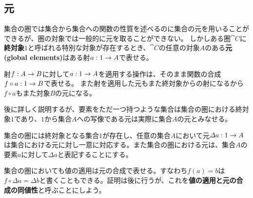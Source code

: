\subsection{元}\label{chap-3.1-element}
		集合の圏では集合から集合への関数の性質を述べるのに集合の元を用いることができるが、圏の対象では一般的に元を取ることができない。
		しかしある圏$\cat{C}$に\textbf{終対象}$1$と呼ばれる特別な対象が存在するとき、$\cat{C}$の任意の対象$A$のある\textbf{元(global elements)}はある射$a:1\rightarrow A$で表せる。
		\begin{center}
		\end{center}

		射$f:A\rightarrow B$に対して$a:1\rightarrow A$を適用する操作は、そのまま関数の合成$f\circ a:1\rightarrow B$で表せる。
		また射を適用した元もまた終対象からの射になるから$f\circ a$もまた対象$B$の元になる。

		後に詳しく説明するが、要素をただ一つ持つような集合は集合の圏における終対象$1$であり、$1$から集合$A$への写像である元は実際に集合$A$の元とみなせる。
		\begin{prop}[集合の圏における元]\label{prop-elements-of-sets}
			集合の圏には終対象となる集合$1$が存在し、任意の集合$A$において元$\varDelta a:1\rightarrow A$は集合における元に対し一意に対応する。また集合の圏における元は、集合$A$の要素$a$に対して$\varDelta a$と表記することにする。
		\end{prop}

    集合の圏においても値の適用は元の合成で表せる。すなわち$f(a)=b$は$f\circ\varDelta a = \varDelta b$と書くこともできる。証明は後に行うが、これを\textbf{値の適用と元の合成の同値性}と呼ぶことにしよう。